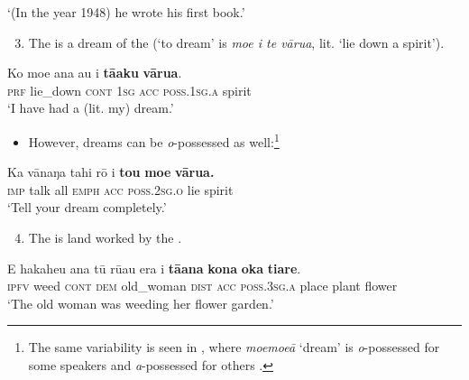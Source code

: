 \glt
‘(In the year 1948) he wrote his first book.’ \textstyleExampleref{[R539-1.080]}
\z

\begin{enumerate}
\setcounter{enumi}{2}
\item 
The  is a dream of the  (‘to dream’ is \textit{moe i te vārua}, lit. ‘lie down a spirit’).

\end{enumerate}

\ea\label{ex:6.73}
\gll Ko moe {\ꞌ}ana au i \textbf{tā{\ꞌ}aku} \textbf{vārua}. \\
\textsc{prf} lie\_down \textsc{cont} \textsc{1sg} \textsc{acc} \textsc{poss.1sg.a} spirit \\

\glt
‘I have had a (lit. my) dream.’ \textstyleExampleref{[R167.045]} 
\z

\begin{itemize}
\item[]
However, dreams can be \textit{o}{}-possessed as well:\footnote{\label{fn:299}The same variability is seen in , where \textit{moemoe}\textit{ā} ‘dream’ is \textit{o}{}-possessed for some speakers and \textit{a}{}-possessed for others \citep[170]{Harlow2007Maori}.}
\end{itemize}

\ea\label{ex:6.74}
\gll Ka vānaŋa tahi rō i \textbf{to{\ꞌ}u} \textbf{moe} \textbf{vārua.}\\
\textsc{imp} talk all \textsc{emph} \textsc{acc} \textsc{poss.2sg.o} lie spirit\\

\glt
‘Tell your dream completely.’ \textstyleExampleref{[R105.075]} 
\z

\begin{enumerate}
\setcounter{enumi}{3}
\item 
The  is land worked by the .

\end{enumerate}

\ea\label{ex:6.75}
\gll E hakaheu {\ꞌ}ana tū rū{\ꞌ}au era i \textbf{tā{\ꞌ}ana} \textbf{kona} \textbf{{\ꞌ}oka} \textbf{tiare}. \\
\textsc{ipfv} weed \textsc{cont} \textsc{dem} old\_woman \textsc{dist} \textsc{acc} \textsc{poss.3sg.a} place plant flower \\

\glt
‘The old woman was weeding her flower garden.’ \textstyleExampleref{[R301.103]} 
\z

